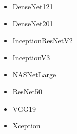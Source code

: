 \documentclass[10pt]{article}
\newif\ifen
\newif\ifde
\newcommand{\en}[1]{\ifen#1\fi}
\newcommand{\de}[1]{\ifde#1\fi}
\begin{document}
			\de{\noindent Verschiedene Modelle wurden im Kapitel ``\nameref{sec:section_validation_compare_cnn_models}'' mit den gleichen Parametern wie oben ausprobiert:}
			\en{\noindent Different models were tried out in chapter ``\nameref{sec:section_validation_comparison_cnn_models}'' with the same parameters as above:}
		
			\begin{itemize}
				\item DenseNet121
				\item DenseNet201
				\item InceptionResNetV2
				\item InceptionV3
				\item NASNetLarge
				\item ResNet50
				\item VGG19
				\item Xception
			\end{itemize}
			
\end{document}
